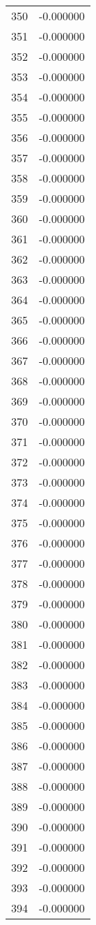 \documentclass[12pt]{article}
\begin{document}
\begin{longtable}{@{}cc@{}}
350 & -0.000000 \\
351 & -0.000000 \\
352 & -0.000000 \\
353 & -0.000000 \\
354 & -0.000000 \\
355 & -0.000000 \\
356 & -0.000000 \\
357 & -0.000000 \\
358 & -0.000000 \\
359 & -0.000000 \\
360 & -0.000000 \\
361 & -0.000000 \\
362 & -0.000000 \\
363 & -0.000000 \\
364 & -0.000000 \\
365 & -0.000000 \\
366 & -0.000000 \\
367 & -0.000000 \\
368 & -0.000000 \\
369 & -0.000000 \\
370 & -0.000000 \\
371 & -0.000000 \\
372 & -0.000000 \\
373 & -0.000000 \\
374 & -0.000000 \\
375 & -0.000000 \\
376 & -0.000000 \\
377 & -0.000000 \\
378 & -0.000000 \\
379 & -0.000000 \\
380 & -0.000000 \\
381 & -0.000000 \\
382 & -0.000000 \\
383 & -0.000000 \\
384 & -0.000000 \\
385 & -0.000000 \\
386 & -0.000000 \\
387 & -0.000000 \\
388 & -0.000000 \\
389 & -0.000000 \\
390 & -0.000000 \\
391 & -0.000000 \\
392 & -0.000000 \\
393 & -0.000000 \\
394 & -0.000000 \\

\end{longtable}
\end{document}
